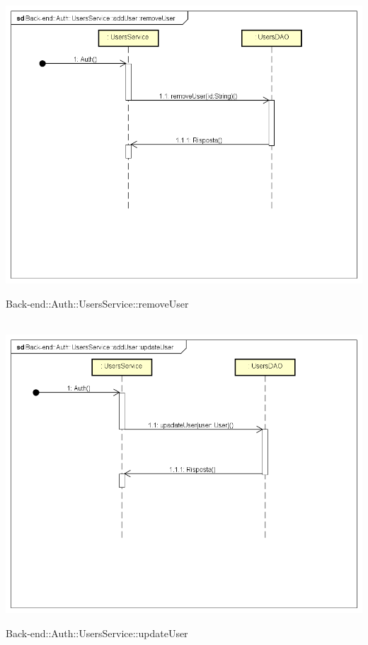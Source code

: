 \\ \includegraphics[width=\textwidth,height=\textheight,keepaspectratio]{images/diagrams/back-end/Ufficial_Backend/Back-end__Auth__UsersService__removeUser.png} 	\caption{Back-end::Auth::UsersService::removeUser}
\\ \includegraphics[width=\textwidth,height=\textheight,keepaspectratio]{images/diagrams/back-end/Ufficial_Backend/Back-end__Auth__UsersService__updateUser.png} 	\caption{Back-end::Auth::UsersService::updateUser}
